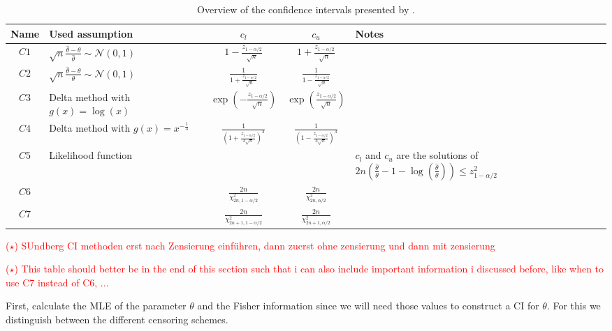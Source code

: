 \begin{table}[htbp]
	\centering
	\begin{tabular}{c|l|c|c|l}
		\hline
		Name & Used assumption & $c_l$ & $c_u$ & Notes \\
		\hline
		$C1$ & $\sqrt{n} \frac{\hat \theta - \theta}{\hat \theta} \sim \mathcal N (0, 1)$ & $1 - \frac{z_{1 - \alpha / 2}}{\sqrt{n}}$ &  $1 + \frac{z_{1 - \alpha / 2}}{\sqrt{n}}$ & \\
		$C2$ & $\sqrt{n} \frac{\hat \theta - \theta}{\theta} \sim \mathcal N (0, 1)$ &  $\frac{1}{1 + \frac{z_{1 - \alpha / 2}}{\sqrt{n}}}$ &  $\frac{1}{1 - \frac{z_{1 - \alpha / 2}}{\sqrt{n}}}$ & \\
		$C3$ & Delta method with $g(x) = \log(x)$ &  $\exp \left( - \frac{z_{1 - \alpha / 2}}{\sqrt{n}} \right)$ &  $\exp \left( \frac{z_{1 - \alpha / 2}}{\sqrt{n}} \right)$ & \\
		$C4$ & Delta method with $g(x) = x^{- \frac{1}{3}}$ & $\frac{1}{\left( 1 + \frac{z_{1 - \alpha / 2}}{3 \sqrt{n}} \right)^3}$ & $\frac{1}{\left( 1 - \frac{z_{1 - \alpha / 2}}{3 \sqrt{n}} \right)^3}$ & \\
		$C5$ & Likelihood function & & & $c_l$ and $c_u$ are the solutions of $2n \left( \frac{\hat \theta}{\theta} - 1 - \log \left( \frac{\hat \theta}{\theta}  \right) \right) \leq z_{1 - \alpha / 2}^2$ \\
		$C6$ & & $\frac{2n}{\chi^2_{2n, 1 - \alpha / 2}}$ &$\frac{2n}{\chi^2_{2n, \alpha / 2}}$ & \\
		$C7$ & & $\frac{2n}{\chi^2_{2n+1, 1 - \alpha / 2}}$ & $\frac{2n}{\chi^2_{2n+1, \alpha / 2}}$ & \\
		\hline
	\end{tabular}
	\caption{Overview of the confidence intervals presented by \cite{Sundberg2001}.}
	\label{tab:confidence_intervals}
\end{table}

\textcolor{red}{($\star$) SUndberg CI methoden erst nach Zensierung einführen, dann zuerst ohne zensierung und dann mit zensierung}

\textcolor{red}{($\star$) This table should better be in the end of this section such that i can also include important information i discussed before, like when to use C7 instead of C6, ...}


First, calculate the MLE of the parameter $\theta$ and the Fisher information since we will need those values to construct a CI for $\theta$. For this we distinguish between the different censoring schemes. 

